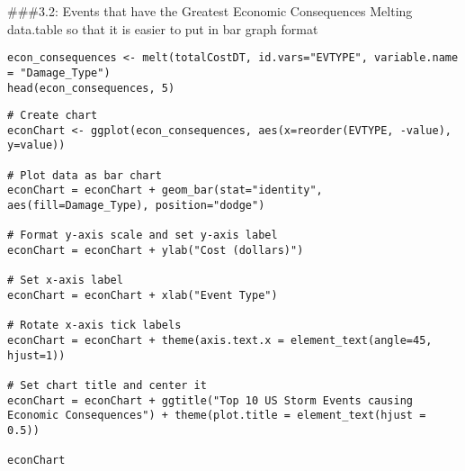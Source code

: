 \documentclass[
]{article}
\begin{document}
\#\#\#3.2: Events that have the Greatest Economic Consequences Melting
data.table so that it is easier to put in bar graph format

\begin{verbatim}
econ_consequences <- melt(totalCostDT, id.vars="EVTYPE", variable.name = "Damage_Type")
head(econ_consequences, 5)
\end{verbatim}

\begin{verbatim}
# Create chart
econChart <- ggplot(econ_consequences, aes(x=reorder(EVTYPE, -value), y=value))

# Plot data as bar chart
econChart = econChart + geom_bar(stat="identity", aes(fill=Damage_Type), position="dodge")

# Format y-axis scale and set y-axis label
econChart = econChart + ylab("Cost (dollars)") 

# Set x-axis label
econChart = econChart + xlab("Event Type") 

# Rotate x-axis tick labels 
econChart = econChart + theme(axis.text.x = element_text(angle=45, hjust=1))

# Set chart title and center it
econChart = econChart + ggtitle("Top 10 US Storm Events causing Economic Consequences") + theme(plot.title = element_text(hjust = 0.5))

econChart
\end{verbatim}
\end{document}

